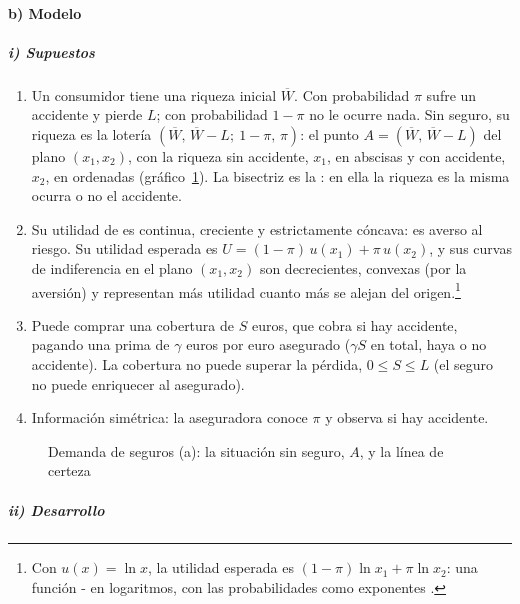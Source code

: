 \documentclass[11pt]{article}
\begin{document}
\paragraph{b) Modelo}

\subparagraph{i) Supuestos}

\begin{enumerate}
\item Un consumidor tiene una riqueza inicial $\overline{W}$. Con probabilidad $\pi$ sufre un accidente y pierde $L$; con probabilidad $1-\pi$ no le ocurre nada. Sin seguro, su riqueza es la lotería $(\overline{W},\,\overline{W}-L;\ 1-\pi,\,\pi)$: el punto $A=(\overline{W},\,\overline{W}-L)$ del plano $(x_1,x_2)$, con la riqueza sin accidente, $x_1$, en abscisas y con accidente, $x_2$, en ordenadas (gráfico~\ref{fig:seguros-a}). La bisectriz es la : en ella la riqueza es la misma ocurra o no el accidente.
\item Su utilidad de  es continua, creciente y estrictamente cóncava: es averso al riesgo. Su utilidad esperada es $U=(1-\pi)\,u(x_1)+\pi\,u(x_2)$, y sus curvas de indiferencia en el plano $(x_1,x_2)$ son decrecientes, convexas (por la aversión) y representan más utilidad cuanto más se alejan del origen.\footnote{Con $u(x)=\ln x$, la utilidad esperada es $(1-\pi)\ln x_1+\pi\ln x_2$: una función - en logaritmos, con las probabilidades como exponentes .}
\item Puede comprar una cobertura de $S$ euros, que cobra si hay accidente, pagando una prima de $\gamma$ euros por euro asegurado ($\gamma S$ en total, haya o no accidente). La cobertura no puede superar la pérdida, $0\leq S\leq L$ (el seguro no puede enriquecer al asegurado).
\item Información simétrica: la aseguradora conoce $\pi$ y observa si hay accidente.
\end{enumerate}

\begin{figure}[H]
\centering
\caption{Demanda de seguros (a): la situación sin seguro, $A$, y la línea de certeza}\label{fig:seguros-a}
\end{figure}

\subparagraph{ii) Desarrollo}
\end{document}
